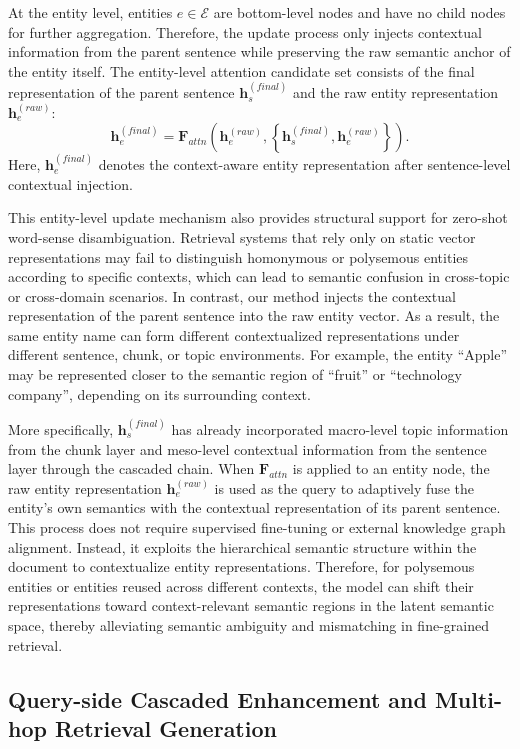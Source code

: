 \documentclass[preprint,12pt]{elsarticle}
\begin{document}
At the entity level, entities $e \in \mathcal{E}$ are bottom-level nodes and have no child nodes for further aggregation. Therefore, the update process only injects contextual information from the parent sentence while preserving the raw semantic anchor of the entity itself. The entity-level attention candidate set consists of the final representation of the parent sentence $\mathbf{h}_{s}^{(final)}$ and the raw entity representation $\mathbf{h}_{e}^{(raw)}$:
\[
\mathbf{h}_{e}^{(final)}
=
\mathbf{F}_{attn}
\left(
\mathbf{h}_{e}^{(raw)},
\left\{
\mathbf{h}_{s}^{(final)},
\mathbf{h}_{e}^{(raw)}
\right\}
\right).
\]
Here, $\mathbf{h}_{e}^{(final)}$ denotes the context-aware entity representation after sentence-level contextual injection.

This entity-level update mechanism also provides structural support for zero-shot word-sense disambiguation. Retrieval systems that rely only on static vector representations may fail to distinguish homonymous or polysemous entities according to specific contexts, which can lead to semantic confusion in cross-topic or cross-domain scenarios. In contrast, our method injects the contextual representation of the parent sentence into the raw entity vector. As a result, the same entity name can form different contextualized representations under different sentence, chunk, or topic environments. For example, the entity ``Apple'' may be represented closer to the semantic region of ``fruit'' or ``technology company'', depending on its surrounding context.

More specifically, $\mathbf{h}_{s}^{(final)}$ has already incorporated macro-level topic information from the chunk layer and meso-level contextual information from the sentence layer through the cascaded chain. When $\mathbf{F}_{attn}$ is applied to an entity node, the raw entity representation $\mathbf{h}_{e}^{(raw)}$ is used as the query to adaptively fuse the entity's own semantics with the contextual representation of its parent sentence. This process does not require supervised fine-tuning or external knowledge graph alignment. Instead, it exploits the hierarchical semantic structure within the document to contextualize entity representations. Therefore, for polysemous entities or entities reused across different contexts, the model can shift their representations toward context-relevant semantic regions in the latent semantic space, thereby alleviating semantic ambiguity and mismatching in fine-grained retrieval.

\subsection{Query-side Cascaded Enhancement and Multi-hop Retrieval Generation}
\end{document}
